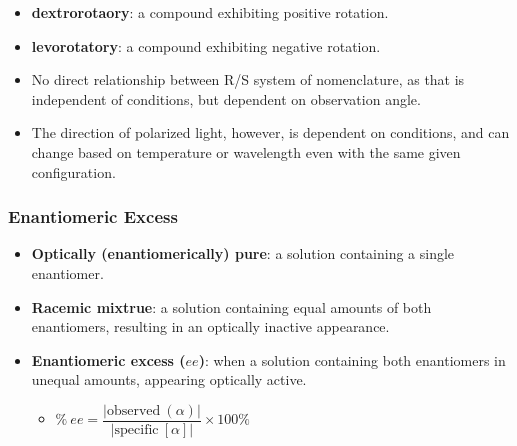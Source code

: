 \documentclass[12pt,a4paper]{article}
\begin{document}
\begin{itemize}
        \begin{itemize}
            \item {\color{pos}\textbf{dextrorotaory}}: a compound exhibiting {\color{pos}positive} rotation.
            \item {\color{neg}\textbf{levorotatory}}: a compound exhibiting {\color{neg}negative} rotation.
            \item No direct relationship between R/S system of nomenclature, as that is independent of conditions, but dependent on observation angle.
            \item The {\color{o-Sun}direction} of polarized light, however, is {\color{o-Sun}dependent on conditions}, and can change based on temperature or wavelength even with the same given configuration.
        \end{itemize}
    \subsubsection{Enantiomeric Excess}
    \begin{itemize}
        \item \textbf{Optically (enantiomerically) pure}: a solution containing a single enantiomer.
        \item \textbf{Racemic mixtrue}: a solution containing equal amounts of both enantiomers, resulting in an optically inactive appearance.
        \item \textbf{Enantiomeric excess (\(ee\))}: when a solution containing both enantiomers in unequal amounts, appearing optically active.
            \begin{itemize}
                \item \(\%~ee = \dfrac{|\text{observed}~(\alpha)|}{|\text{specific}~[\alpha]|} \times 100\%\)
            \end{itemize}
    \end{itemize}
\end{itemize}
\end{document}
